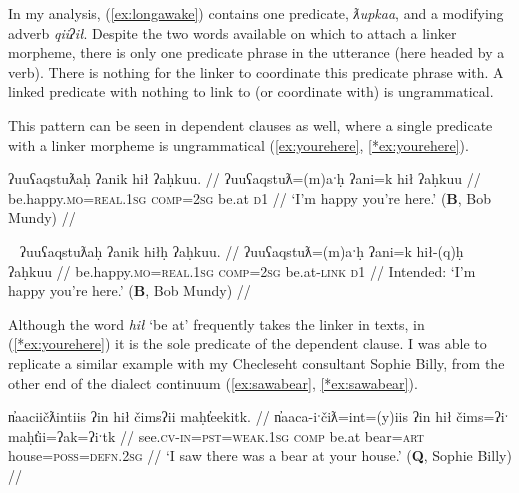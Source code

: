 In my analysis, (\ref{ex:longawake}) contains one predicate, \textit{ƛupkaa}, and a modifying adverb \textit{qiiʔił}. Despite the two words available on which to attach a linker morpheme, there is only one predicate phrase in the utterance (here headed by a verb). There is nothing for the linker to coordinate this predicate phrase with. A linked predicate with nothing to link to (or coordinate with) is ungrammatical.


This pattern can be seen in dependent clauses as well, where a single predicate with a linker morpheme is  ungrammatical (\ref{ex:yourehere}, \ref{*ex:yourehere}).

\ex \label{ex:yourehere}
\begingl
\glpreamble ʔuuʕaqstuƛaḥ ʔanik hił ʔaḥkuu. //
\gla ʔuuʕaqstuƛ=(m)aˑḥ ʔani=k hił ʔaḥkuu //
\glb be.happy.\textsc{mo}=\textsc{real.1sg} \textsc{comp}=\textsc{2sg} be.at \textsc{d1} //
\glft `I'm happy you're here.' (\textbf{B}, Bob Mundy) //
\endgl
\xe

\ex~ \label{*ex:yourehere}
\begingl
\glpreamble *ʔuuʕaqstuƛaḥ ʔanik hiłḥ ʔaḥkuu. //
\gla ʔuuʕaqstuƛ=(m)aˑḥ ʔani=k hił-(q)ḥ ʔaḥkuu //
\glb be.happy.\textsc{mo}=\textsc{real.1sg} \textsc{comp}=\textsc{2sg} be.at-\textsc{link} \textsc{d1} //
\glft Intended: `I'm happy you're here.' (\textbf{B}, Bob Mundy) //
\endgl
\xe

Although the word \textit{hił} `be at' frequently takes the linker in texts, in (\ref{*ex:yourehere}) it is the sole predicate of the dependent clause. I was able to replicate a similar example with my Checleseht consultant Sophie Billy, from the other end of the dialect continuum (\ref{ex:sawabear}, \ref{*ex:sawabear}).

\ex \label{ex:sawabear}
\begingl
\glpreamble n̓aaciičƛintiis ʔin hił čimsʔii maḥt̓eekitk. //
\gla n̓aaca-iˑčiƛ=int=(y)iis ʔin hił čims=ʔiˑ maḥt̓ii=ʔak=ʔiˑtk //
\glb see.\textsc{cv}-\textsc{in}=\textsc{pst}=\textsc{weak.1sg} \textsc{comp} be.at bear=\textsc{art} house=\textsc{poss}=\textsc{defn.2sg} //
\glft `I saw there was a bear at your house.' (\textbf{Q}, Sophie Billy) //
\endgl
\xe

